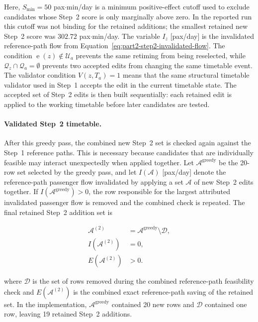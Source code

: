 \documentclass[preprint,12pt]{elsarticle}
\begin{document}
Here, \(S_{\min}=50\) pax\(\cdot\)min/day is a minimum positive-effect cutoff used to exclude candidates whose Step~2 score is only marginally above zero. In the reported run this cutoff was not binding for the retained additions; the smallest retained new Step~2 score was \(302.72\) pax\(\cdot\)min/day. The variable \(I_z\) [pax/day] is the invalidated reference-path flow from Equation~\eqref{eq:part2-step2-invalidated-flow}. The condition \(\operatorname{e}(z)\notin\mathcal{U}_a\) prevents the same retiming from being reselected, while \(\mathcal{Q}_z\cap\mathcal{Q}_a=\emptyset\) prevents two accepted edits from changing the same timetable event. The validator condition \(V(z,T_a)=1\) means that the same structural timetable validator used in Step~1 accepts the edit in the current timetable state. The accepted set of Step~2 edits is then built sequentially: each retained edit is applied to the working timetable before later candidates are tested.

\paragraph*{Validated Step~2 timetable.}
After this greedy pass, the combined new Step~2 set is checked again against the Step~1 reference paths. This is necessary because candidates that are individually feasible may interact unexpectedly when applied together. Let \(\mathcal{A}^{\mathrm{greedy}}\) be the 20-row set selected by the greedy pass, and let \(I(\mathcal{A})\) [pax/day] denote the reference-path passenger flow invalidated by applying a set \(\mathcal{A}\) of new Step~2 edits together. If \(I(\mathcal{A}^{\mathrm{greedy}})>0\), the row responsible for the largest attributed invalidated passenger flow is removed and the combined check is repeated. The final retained Step~2 addition set is

\begin{equation}
\begin{aligned}
\mathcal{A}^{(2)}
&=
\mathcal{A}^{\mathrm{greedy}}\setminus \mathcal{D},\\
I(\mathcal{A}^{(2)})
&=0,\\
E(\mathcal{A}^{(2)})
&>0.
\end{aligned}
\label{eq:part2-step2-final-set}
\end{equation}

where \(\mathcal{D}\) is the set of rows removed during the combined reference-path feasibility check and \(E(\mathcal{A}^{(2)})\) is the combined exact reference-path saving of the retained set. In the implementation, \(\mathcal{A}^{\mathrm{greedy}}\) contained 20 new rows and \(\mathcal{D}\) contained one row, leaving 19 retained Step~2 additions.
\end{document}
